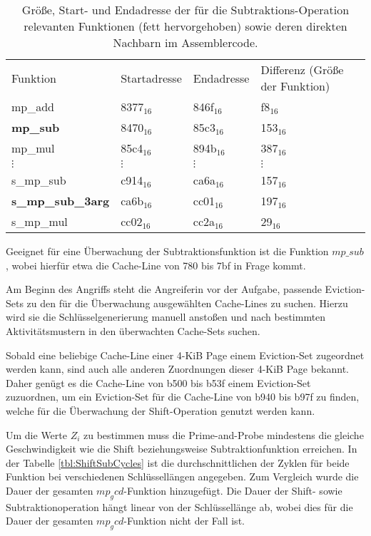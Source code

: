\begin{table}[h]
\caption{Größe, Start- und Endadresse der für die Subtraktions-Operation relevanten Funktionen (fett hervorgehoben) sowie deren direkten Nachbarn im Assemblercode.}
\label{tbl:assOffsetSub}
\begin{tabular}{llll}
Funktion         & Startadresse & Endadresse & Differenz (Größe der Funktion) \\[10pt]
mp\_add & 8377$_{16}$ & 846f$_{16}$ & f8$_{16}$\\
\textbf{mp\_sub} & 8470$_{16}$ & 85c3$_{16}$ & 153$_{16}$ \\
mp\_mul & 85c4$_{16}$ & 894b$_{16}$ & 387$_{16}$ \\
$\vdots$               &  $\vdots$             &    $\vdots$         &     $\vdots$   \\
s\_mp\_sub       & c914$_{16}$         & ca6a$_{16}$       & 157$_{16}$   \\
\textbf{s\_mp\_sub\_3arg} & ca6b$_{16}$         & cc01$_{16}$       & 197$_{16}$   \\
s\_mp\_mul       & cc02$_{16}$         & cc2a$_{16}$       & 29$_{16}$   
\end{tabular}
\end{table}

Geeignet für eine Überwachung der Subtraktionsfunktion ist die Funktion $mp\_sub$, wobei hierfür etwa die Cache-Line von 780 bis 7bf in Frage kommt.

Am Beginn des Angriffs steht die Angreiferin vor der Aufgabe, passende Eviction-Sets zu den für die Überwachung ausgewählten Cache-Lines zu suchen.
Hierzu wird sie die Schlüsselgenerierung manuell anstoßen und nach bestimmten Aktivitätsmustern in den überwachten Cache-Sets suchen.

Sobald eine beliebige Cache-Line einer 4-KiB Page einem Eviction-Set zugeordnet werden kann, sind auch alle anderen Zuordnungen dieser 4-KiB Page bekannt.
Daher genügt es die Cache-Line von b500 bis b53f einem Eviction-Set zuzuordnen, um ein Eviction-Set für die Cache-Line von b940 bis b97f zu finden, welche für die Überwachung der Shift-Operation genutzt werden kann.

Um die Werte $Z_i$ zu bestimmen muss die Prime-and-Probe mindestens die gleiche Geschwindigkeit wie die Shift beziehungsweise Subtraktionfunktion erreichen.
In der Tabelle \ref{tbl:ShiftSubCycles} ist die durchschnittlichen der Zyklen für beide Funktion bei verschiedenen Schlüssellängen angegeben. Zum Vergleich wurde die Dauer der gesamten $mp_gcd$-Funktion hinzugefügt.
Die Dauer der Shift- sowie Subtraktionoperation hängt linear von der Schlüssellänge ab, wobei dies für die Dauer der gesamten $mp_gcd$-Funktion nicht der Fall ist.

